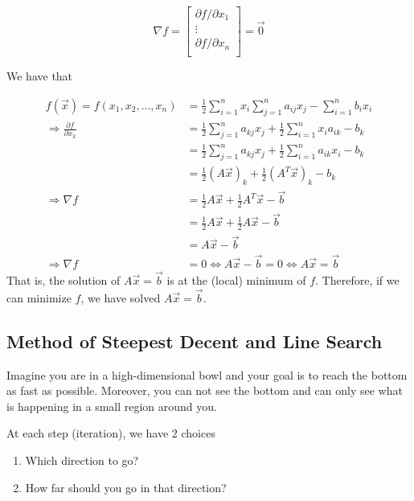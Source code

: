 \begin{equation*}
    \nabla f =
    \begin{bmatrix}
        \partial f / \partial x_1\\
        \vdots \\
        \partial f / \partial x_n\\
    \end{bmatrix}
    =\vec{0}
\end{equation*}

We have that

\begin{align*}
    f(\vec{x}) = f(x_1, x_2, \ldots, x_n) &= \frac{1}{2} \sum_{i=1}^{n} x_i \sum_{j=1}^{n} a_{ij} x_j - \sum_{i=1}^{n} b_i x_i \\
    \Rightarrow \frac{\partial f}{\partial x_k} &=\frac{1}{2} \sum_{j=1}^{n} a_{kj} x_j + \frac{1}{2} \sum_{i=1}^{n} x_i a_{ik} - b_k \\
    &=\frac{1}{2} \sum_{j=1}^{n} a_{kj} x_j + \frac{1}{2} \sum_{i=1}^{n} a_{ik} x_i - b_k \\
    &= \frac{1}{2} (A\vec{x})_k + \frac{1}{2} (A^T\vec{x})_k - b_k \\
    \Rightarrow \nabla f &= \frac{1}{2} A\vec{x} + \frac{1}{2} A^T\vec{x} - \vec{b} \\
    &= \frac{1}{2} A\vec{x} + \frac{1}{2} A\vec{x} - \vec{b} \\
    &= A\vec{x} - \vec{b} \\
    \Rightarrow \nabla f &= 0 \Leftrightarrow A\vec{x} - \vec{b} = 0
    \Leftrightarrow A \vec{x} = \vec{b}
\end{align*}
That is, the solution of $A \vec{x} = \vec{b}$ is at the (local) minimum of $f$. Therefore, if we can minimize $f$, we have solved $A \vec{x} = \vec{b}$.


\subsection*{Method of Steepest Decent and Line Search}
Imagine you are in a high-dimensional bowl and your goal is to reach the bottom as fast as possible. Moreover, you can not see the bottom and can only see what is happening in a small region around you.

At each step (iteration), we have 2 choices

\begin{enumerate}[1)]
    \item Which direction to go?
    \item How far should you go in that direction?
\end{enumerate}

